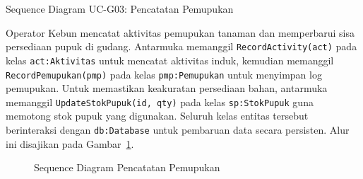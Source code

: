 \newpage

\item{Sequence Diagram UC-G03: Pencatatan Pemupukan}

Operator Kebun mencatat aktivitas pemupukan tanaman dan memperbarui sisa persediaan pupuk di gudang. 
Antarmuka memanggil \texttt{RecordActivity(act)} pada kelas \texttt{act:Aktivitas} untuk mencatat aktivitas induk, 
kemudian memanggil \texttt{RecordPemupukan(pmp)} pada kelas \texttt{pmp:Pemupukan} untuk menyimpan log pemupukan. 
Untuk memastikan keakuratan persediaan bahan, antarmuka memanggil \texttt{UpdateStokPupuk(id, qty)} pada kelas 
\texttt{sp:StokPupuk} guna memotong stok pupuk yang digunakan. Seluruh kelas entitas tersebut berinteraksi dengan 
\texttt{db:Database} untuk pembaruan data secara persisten. Alur ini disajikan pada Gambar~\ref{fig:seq_ucg03_pemupukan}.

\begin{figure}[htbp]
\centering
{}
\caption{Sequence Diagram Pencatatan Pemupukan}
\label{fig:seq_ucg03_pemupukan}
\end{figure}

